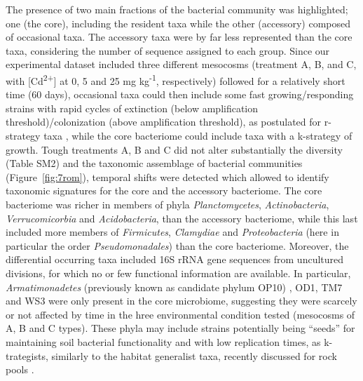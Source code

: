 The presence of two main fractions of the bacterial community was highlighted; one (the core), including the resident taxa while the other (accessory) composed of occasional taxa. The accessory taxa were by far less represented than the core taxa, considering the number of sequence assigned to each group. Since our experimental dataset included three different mesocosms (treatment A, B, and C, with [Cd\textsuperscript{2+}] at 0, 5 and 25 mg kg\textsuperscript{-1}, respectively) followed for a relatively short time (60 days), occasional taxa could then include some fast growing/responding strains with rapid cycles of extinction (below amplification threshold)/colonization (above amplification threshold), as postulated for r-strategy taxa \cite{safriel1980criteria}, while the core bacteriome could include taxa with a k-strategy of growth. Tough treatments A, B and C did not alter substantially the diversity (Table SM2) and the taxonomic assemblage of bacterial communities (Figure~\ref{fig:7rom}), temporal shifts were detected which allowed to identify taxonomic signatures for the core and the accessory bacteriome. The core bacteriome was richer in members of phyla \textit{Planctomycetes}, \textit{Actinobacteria}, \textit{Verrucomicorbia} and \textit{Acidobacteria}, than the accessory bacteriome, while this last included more members of \textit{Firmicutes}, \textit{Clamydiae} and \textit{Proteobacteria }(here in particular the order \textit{Pseudomonadales}) than the core bacteriome. Moreover, the differential occurring taxa included 16S rRNA gene sequences from uncultured divisions, for which no or few functional information are available. In particular, \textit{Armatimonadetes} (previously known as candidate phylum OP10) \cite{tamaki2010armatimonas}, OD1, TM7 and WS3 were only present in the core microbiome, suggesting they were scarcely or not affected by time in the hree environmental condition tested (mesocosms of A, B and C types). These phyla may include strains potentially being ``seeds'' for maintaining soil bacterial functionality and with low replication times, as k- trategists, similarly to the habitat generalist taxa, recently discussed for rock pools \cite{szekely2014importance}.\\
